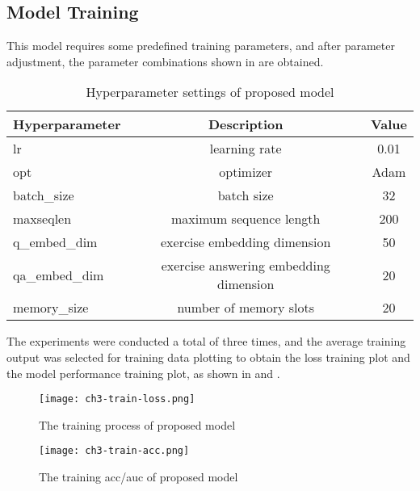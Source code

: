 \subsection{Model Training}
This model requires some predefined training parameters, and after parameter adjustment, the parameter combinations shown in \tblname{\ref{tbl:ch3-hpsetting}} are obtained.
\begin{table}[htbp!]
    \caption{Hyperparameter settings of proposed model}\label{tbl:ch3-hpsetting}
    \centering
    \begin{tabular}{l c c}
        \toprule
        Hyperparameter & Description                             & Value \\
        \midrule
        lr             & learning rate                           & 0.01  \\
        opt            & optimizer                               & Adam  \\
        batch\_size    & batch size                              & 32    \\
        maxseqlen      & maximum sequence length                 & 200   \\
        q\_embed\_dim  & exercise embedding dimension            & 50    \\
        qa\_embed\_dim & exercise  answering embedding dimension & 20    \\
        memory\_size   & number of memory slots                  & 20    \\
        \bottomrule
    \end{tabular}
\end{table}
The experiments were conducted a total of three times, and the average training output was selected for training data plotting to obtain the loss training plot and the model performance training plot, as shown in \figname{\ref{fig:ch3-train-loss}} and \figname{\ref{fig:ch3-train-acc}}.
\begin{figure}[htbp!]
    \centering
    \texttt{[image: ch3-train-loss.png]}
    \caption{The training process of proposed model}\label{fig:ch3-train-loss}
\end{figure}

\begin{figure}[htb]
    \centering
    \texttt{[image: ch3-train-acc.png]}
    \caption{The training acc/auc of proposed model}\label{fig:ch3-train-acc}
\end{figure}

